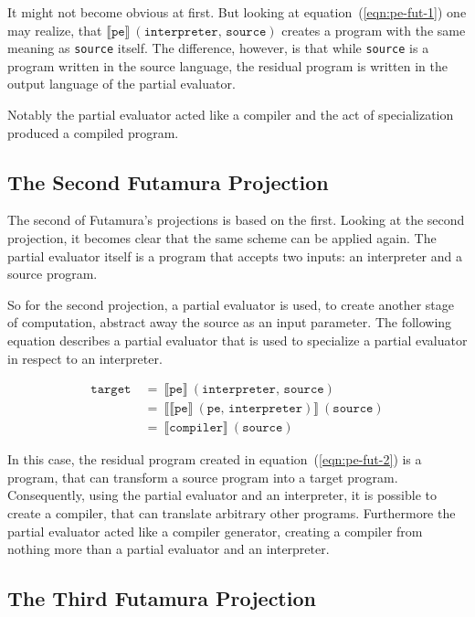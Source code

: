It might not become obvious at first.
But looking at equation~(\ref{eqn:pe-fut-1}) one may realize, that $\llbracket \mathtt{pe} \rrbracket \ (\mathtt{interpreter},\, \mathtt{source})$ creates a program with the same meaning as \texttt{source} itself.
The difference, however, is that while \texttt{source} is a program written in the source language, the residual program is written in the output language of the partial evaluator.

Notably the partial evaluator acted like a compiler and the act of specialization produced a compiled program.


\subsection{The Second Futamura Projection}\label{sec:futamura-second}

The second of Futamura's projections is based on the first.
Looking at the second projection, it becomes clear that the same scheme can be applied again.
The partial evaluator itself is a program that accepts two inputs: an interpreter and a source program.

So for the second projection, a partial evaluator is used, to create another stage of computation, abstract away the source as an input parameter.
The following equation describes a partial evaluator that is used to specialize a partial evaluator in respect to an interpreter.

\begin{align}
  \mathtt{target}\
  &=\ \llbracket \mathtt{pe} \rrbracket \ (\mathtt{interpreter},\, \mathtt{source}) \\
  &=\ \llbracket \llbracket \mathtt{pe} \rrbracket \ (\mathtt{pe},\, \mathtt{interpreter}) \rrbracket \ (\mathtt{source}) \label{eqn:pe-fut-2}\\
  &=\ \llbracket \mathtt{compiler} \rrbracket \ (\mathtt{source})
\end{align}

In this case, the residual program created in equation~(\ref{eqn:pe-fut-2}) is a program, that can transform a source program into a target program.
Consequently, using the partial evaluator and an interpreter, it is possible to create a compiler, that can translate arbitrary other programs.
Furthermore the partial evaluator acted like a compiler generator, creating a compiler from nothing more than a partial evaluator and an interpreter.


\subsection{The Third Futamura Projection}\label{sec:futamura-thrid}

